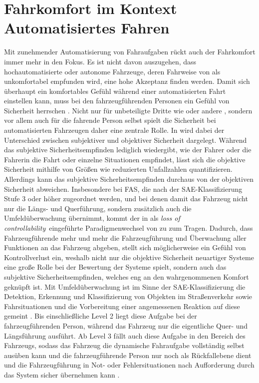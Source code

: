 \section{Fahrkomfort im Kontext Automatisiertes Fahren}\label{sec:fahrkomfort}
Mit zunehmender Automatisierung von Fahraufgaben rückt auch der Fahrkomfort immer mehr in den Fokus. Es ist nicht davon auszugehen, dass hochautomatisierte oder autonome Fahrzeuge, deren Fahrweise von  als unkomfortabel empfunden wird, eine hohe Akzeptanz finden werden. Damit sich überhaupt ein komfortables Gefühl während einer automatisierten Fahrt einstellen kann, muss bei den fahrzeugführenden Personen ein Gefühl von Sicherheit herrschen \cite{Festner.2019}. Nicht nur für unbeteiligte Dritte wie  oder andere , sondern vor allem auch für die fahrende Person selbst spielt die Sicherheit bei automatisierten Fahrzeugen daher eine zentrale Rolle. In \cite{Festner.2019} wird dabei der Unterschied zwischen subjektiver und objektiver Sicherheit dargelegt. Während das subjektive Sicherheitsempfinden lediglich wiedergibt, wie der Fahrer oder die Fahrerin die Fahrt oder einzelne Situationen empfindet, lässt sich die objektive Sicherheit mithilfe von Größen wie reduzierten Unfallzahlen quantifizieren. Allerdings kann das subjektive Sicherheitsempfinden durchaus von der objektiven Sicherheit abweichen. Insbesondere bei FAS, die nach der SAE-Klassifizierung \cite{SAETaxonomy.2018} Stufe 3 oder höher zugeordnet werden, und bei denen damit das Fahrzeug nicht nur die Längs- und Querführung, sondern zusätzlich auch die Umfeldüberwachung übernimmt, kommt der in \cite{Elbanhawi.2015} als \glqq\textit{loss of controllability}\grqq~eingeführte Paradigmenwechsel von  zu  zum Tragen. Dadurch, dass Fahrzeugführende mehr und mehr die Fahrzeugführung und Überwachung aller Funktionen an das Fahrzeug abgeben, stellt sich möglicherweise ein Gefühl von Kontrollverlust ein, weshalb nicht nur die objektive Sicherheit neuartiger Systeme eine große Rolle bei der Bewertung der Systeme spielt, sondern auch das subjektive Sicherheitsempfinden, welches eng an den wahrgenommenen Komfort geknüpft ist. Mit Umfeldüberwachung ist im Sinne der SAE-Klassifizierung die Detektion, Erkennung und Klassifizierung von Objekten im Straßenverkehr sowie Fahrsituationen und die Vorbereitung einer angemessenen Reaktion auf diese gemeint \cite{SAETaxonomy.2018}. Bis einschließliche Level 2 liegt diese Aufgabe bei der fahrzeugführenden Person, während das Fahrzeug nur die eigentliche Quer- und Längsführung ausführt. Ab Level 3 fällt auch diese Aufgabe in den Bereich des Fahrzeugs, sodass das Fahrzeug die dynamische Fahraufgabe vollständig selbst ausüben kann und die fahrzeugführende Person nur noch als Rückfallebene dient und die Fahrzeugführung in Not- oder Fehlersituationen nach Aufforderung durch das System sicher übernehmen kann \cite{SAETaxonomy.2018}.

